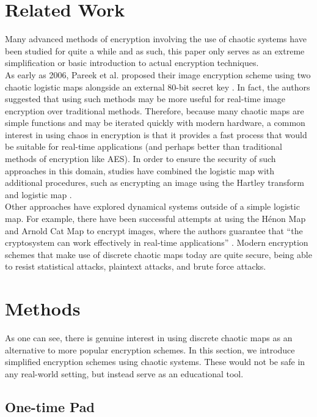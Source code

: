 \documentclass[10pt]{article}
\begin{document}
    \section{Related Work}
    
    Many advanced methods of encryption involving the use of chaotic systems have been studied for quite a while and as such, this paper only serves as an extreme simplification or basic introduction to actual encryption techniques. \\
    
    As early as 2006, Pareek et al. proposed their image encryption scheme using two chaotic logistic maps alongside an external 80-bit secret key \cite{PAREEK2006926}. In fact, the authors suggested that using such methods may be more useful for real-time image encryption over traditional methods. Therefore, because many chaotic maps are simple functions and may be iterated quickly with modern hardware, a common interest in using chaos in encryption is that it provides a fast process that would be suitable for real-time applications (and perhaps better than traditional methods of encryption like AES). In order to ensure the security of such approaches in this domain, studies have combined the logistic map with additional procedures, such as encrypting an image using the Hartley transform and logistic map \cite{Singh}.\\
    
    Other approaches have explored dynamical systems outside of a simple logistic map. For example, there have been successful attempts at using the Hénon Map and Arnold Cat Map to encrypt images, where the authors guarantee that ``the cryptosystem can work effectively in real-time applications'' \cite{Ahmad}. Modern encryption schemes that make use of discrete chaotic maps today are quite secure, being able to resist statistical attacks, plaintext attacks, and brute force attacks.  
    
    \section{Methods}
    
    As one can see, there is genuine interest in using discrete chaotic maps as an alternative to more popular encryption schemes. In this section, we introduce simplified encryption schemes using chaotic systems. These would not be safe in any real-world setting, but instead serve as an educational tool.
    
    \subsection{One-time Pad}
    
\end{document}
